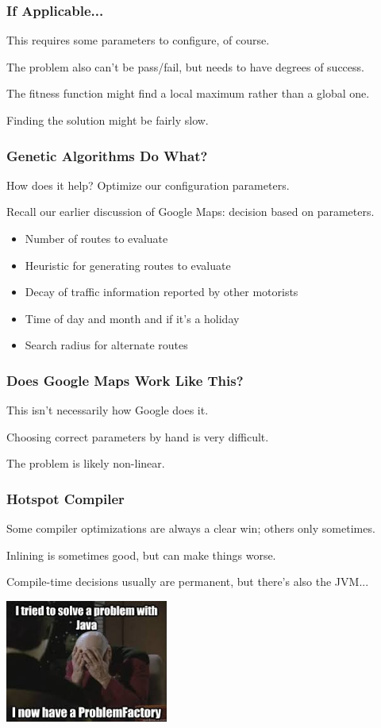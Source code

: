 \begin{frame}
\frametitle{If Applicable...}

This requires some parameters to configure, of course.

The problem also can't be pass/fail, but needs to have degrees of success.

The fitness function might find a local maximum rather than a global one.

Finding the solution might be fairly slow.

\end{frame}


\begin{frame}
\frametitle{Genetic Algorithms Do What?}

How does it help? Optimize our configuration parameters.

Recall our earlier discussion of Google Maps: decision based on parameters.

\begin{itemize}
	\item Number of routes to evaluate
	\item Heuristic for generating routes to evaluate
	\item Decay of traffic information reported by other motorists
	\item Time of day and month and if it's a holiday
	\item Search radius for alternate routes
\end{itemize}

\end{frame}


\begin{frame}
\frametitle{Does Google Maps Work Like This?}

This isn't necessarily how Google does it.

Choosing correct parameters by hand is very difficult.

The problem is likely non-linear.

\end{frame}


\begin{frame}
\frametitle{Hotspot Compiler}

Some compiler optimizations are always a clear win; others only sometimes.

Inlining is sometimes good, but can make things worse. 

Compile-time decisions usually are permanent, but there's also the JVM...

\begin{center}
	\includegraphics[width=0.4\textwidth]{images/problemfactory.jpg}
\end{center}

\end{frame}


